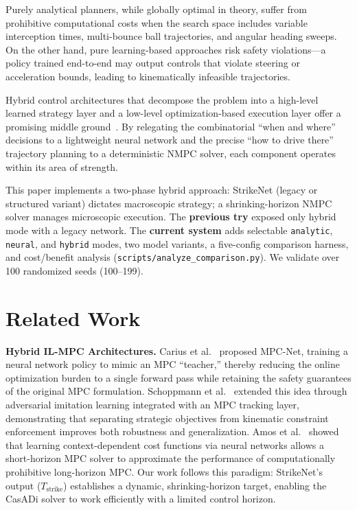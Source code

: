 \documentclass[10pt,twocolumn,letterpaper]{article}
\begin{document}
Purely analytical planners, while globally optimal in theory, suffer
from prohibitive computational costs when the search space includes
variable interception times, multi-bounce ball trajectories, and
angular heading sweeps. On the other hand, pure learning-based
approaches risk safety violations---a policy trained end-to-end may
output controls that violate steering or acceleration bounds, leading
to kinematically infeasible trajectories.

Hybrid control architectures that decompose the problem into a
high-level learned strategy layer and a low-level optimization-based
execution layer offer a promising middle
ground~\cite{carius2018mpc,schoppmann2020model}. By relegating the
combinatorial ``when and where'' decisions to a lightweight neural
network and the precise ``how to drive there'' trajectory planning to
a deterministic NMPC solver, each component operates within its area of
strength.

This paper implements a two-phase hybrid approach: StrikeNet (legacy or
structured variant) dictates macroscopic strategy; a shrinking-horizon
NMPC solver manages microscopic execution. The \textbf{previous try}
exposed only hybrid mode with a legacy network. The \textbf{current system}
adds selectable \texttt{analytic}, \texttt{neural}, and \texttt{hybrid} modes,
two model variants, a five-config comparison harness, and cost/benefit analysis
(\texttt{scripts/analyze\_comparison.py}). We validate over 100 randomized seeds
(100--199).

\section{Related Work}

\textbf{Hybrid IL-MPC Architectures.}
Carius et al.~\cite{carius2018mpc} proposed MPC-Net, training a neural
network policy to mimic an MPC ``teacher,'' thereby reducing the
online optimization burden to a single forward pass while retaining
the safety guarantees of the original MPC formulation. Schoppmann
et al.~\cite{schoppmann2020model} extended this idea through
adversarial imitation learning integrated with an MPC tracking layer,
demonstrating that separating strategic objectives from kinematic
constraint enforcement improves both robustness and generalization.
Amos et al.~\cite{amos2022zipmpc} showed that learning
context-dependent cost functions via neural networks allows a
short-horizon MPC solver to approximate the performance of
computationally prohibitive long-horizon MPC. Our work follows this
paradigm: StrikeNet's output ($T_{\text{strike}}$) establishes a
dynamic, shrinking-horizon target, enabling the CasADi solver to work
efficiently with a limited control horizon.
\end{document}
